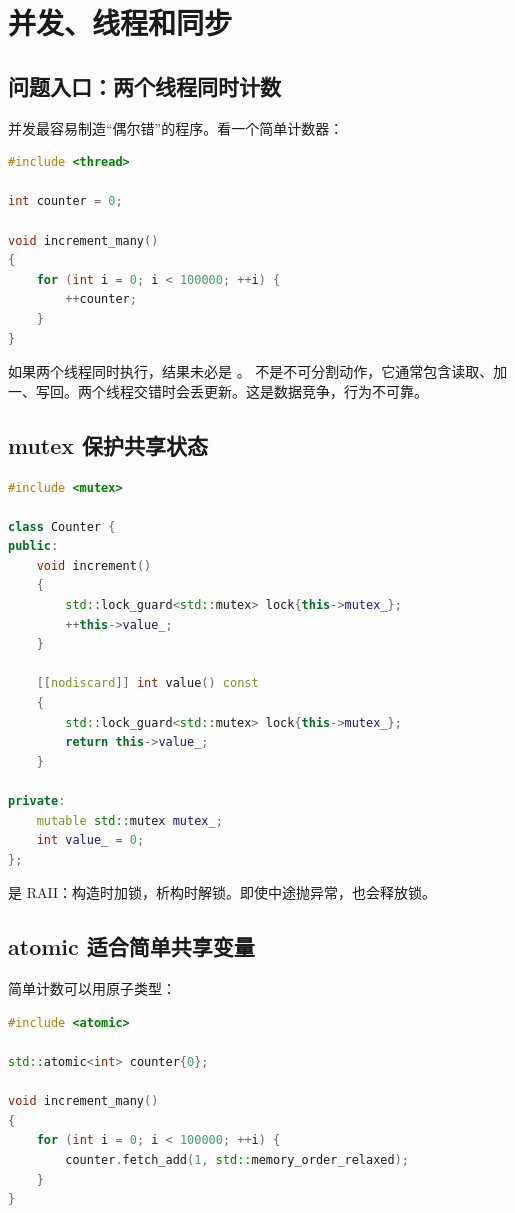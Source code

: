 \chapter{并发、线程和同步}

\section{问题入口：两个线程同时计数}

并发最容易制造“偶尔错”的程序。看一个简单计数器：

\begin{lstlisting}[language=C++,caption={数据竞争}]
#include <thread>

int counter = 0;

void increment_many()
{
    for (int i = 0; i < 100000; ++i) {
        ++counter;
    }
}
\end{lstlisting}

如果两个线程同时执行，结果未必是 。 不是不可分割动作，它通常包含读取、加一、写回。两个线程交错时会丢更新。这是数据竞争，行为不可靠。

\section{mutex 保护共享状态}

\begin{lstlisting}[language=C++,caption={用 mutex 保护计数器}]
#include <mutex>

class Counter {
public:
    void increment()
    {
        std::lock_guard<std::mutex> lock{this->mutex_};
        ++this->value_;
    }

    [[nodiscard]] int value() const
    {
        std::lock_guard<std::mutex> lock{this->mutex_};
        return this->value_;
    }

private:
    mutable std::mutex mutex_;
    int value_ = 0;
};
\end{lstlisting}

 是 RAII：构造时加锁，析构时解锁。即使中途抛异常，也会释放锁。

\section{atomic 适合简单共享变量}

简单计数可以用原子类型：

\begin{lstlisting}[language=C++,caption={atomic 计数}]
#include <atomic>

std::atomic<int> counter{0};

void increment_many()
{
    for (int i = 0; i < 100000; ++i) {
        counter.fetch_add(1, std::memory_order_relaxed);
    }
}
\end{lstlisting}

